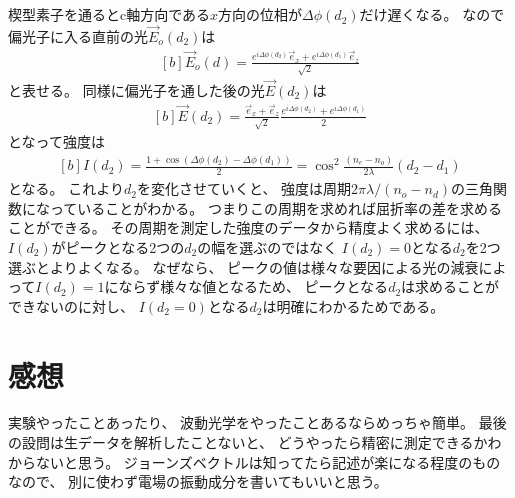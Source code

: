 \documentclass[../../master.tex]{subfiles}
\begin{document}
\section{}
楔型素子を通るとc軸方向である\(x\)方向の位相が\(\Delta\phi(d_2)\)だけ遅くなる。
なので偏光子に入る直前の光\(\vec{E}_o(d_2)\)は
\begin{equation}\begin{aligned}[b]
    \vec{E}_{o}(d) = \frac{e^{i\Delta\phi(d_2)}\vec{e}_x+e^{i\Delta\phi(d_1)}\vec{e}_z}{\sqrt{2}}
\end{aligned}\end{equation}
と表せる。
同様に偏光子を通した後の光\(\vec{E}(d_2)\)は
\begin{equation}\begin{aligned}[b]
    \vec{E}(d_2) = \frac{\vec{e}_x+\vec{e}_z}{\sqrt{2}}\frac{e^{i\Delta\phi(d_2)}+e^{i\Delta\phi(d_1)}}{2}
\end{aligned}\end{equation}
となって強度は
\begin{equation}\begin{aligned}[b]
    I(d_2) = \frac{1+\cos(\Delta\phi(d_2)-\Delta\phi(d_1))}{2}
     = \cos^2 \frac{(n_e-n_o)}{2\lambda}(d_2-d_1)
\end{aligned}\end{equation}
となる。
これより\(d_2\)を変化させていくと、
強度は周期\(2\pi\lambda/(n_o-n_d)\)の三角関数になっていることがわかる。
つまりこの周期を求めれば屈折率の差を求めることができる。
その周期を測定した強度のデータから精度よく求めるには、
\(I(d_2)\)がピークとなる2つの\(d_2\)の幅を選ぶのではなく
\(I(d_2)=0\)となる\(d_2\)を2つ選ぶとよりよくなる。
なぜなら、
ピークの値は様々な要因による光の減衰によって\(I(d_2)=1\)にならず様々な値となるため、
ピークとなる\(d_2\)は求めることができないのに対し、
\(I(d_2=0)\)となる\(d_2\)は明確にわかるためである。

\section*{感想}
実験やったことあったり、
波動光学をやったことあるならめっちゃ簡単。
最後の設問は生データを解析したことないと、
どうやったら精密に測定できるかわからないと思う。
ジョーンズベクトルは知ってたら記述が楽になる程度のものなので、
別に使わず電場の振動成分を書いてもいいと思う。
\end{document}
